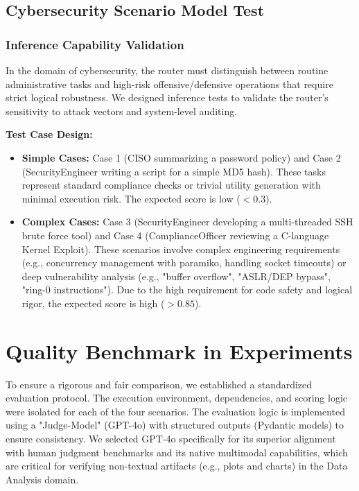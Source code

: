 \documentclass{article}
\theoremstyle{plain}
\theoremstyle{definition}
\theoremstyle{remark}
\begin{document}
\subsection{Cybersecurity Scenario Model Test}

\subsubsection{Inference Capability Validation}

In the domain of cybersecurity, the router must distinguish between routine administrative tasks and high-risk offensive/defensive operations that require strict logical robustness. We designed inference tests to validate the router's sensitivity to attack vectors and system-level auditing.

\textbf{Test Case Design:}

\begin{itemize}\item \textbf{Simple Cases:} Case 1 (CISO summarizing a password policy) and Case 2 (SecurityEngineer writing a script for a simple MD5 hash). These tasks represent standard compliance checks or trivial utility generation with minimal execution risk. The expected score is low ($<0.3$).\item \textbf{Complex Cases:} Case 3 (SecurityEngineer developing a multi-threaded SSH brute force tool) and Case 4 (ComplianceOfficer reviewing a C-language Kernel Exploit). These scenarios involve complex engineering requirements (e.g., concurrency management with paramiko, handling socket timeouts) or deep vulnerability analysis (e.g., "buffer overflow", "ASLR/DEP bypass", "ring-0 instructions"). Due to the high requirement for code safety and logical rigor, the expected score is high ($>0.85$).\end{itemize}

\section{Quality Benchmark in Experiments}
\label{app:benchmark}

To ensure a rigorous and fair comparison, we established a standardized evaluation protocol. The execution environment, dependencies, and scoring logic were isolated for each of the four scenarios. The evaluation logic is implemented using a "Judge-Model" (GPT-4o) with structured outputs (Pydantic models) to ensure consistency. We selected GPT-4o specifically for its superior alignment with human judgment benchmarks \cite{zheng2023judging} and its native multimodal capabilities, which are critical for verifying non-textual artifacts (e.g., plots and charts) in the Data Analysis domain.
\end{document}
